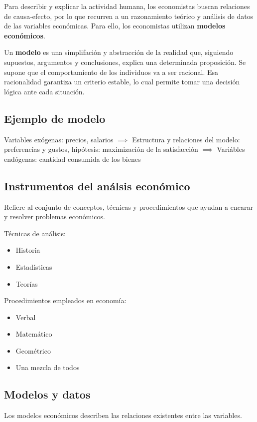 Para describir y explicar la actividad humana,
los economistas buscan relaciones de causa-efecto,
por lo que recurren a un razonamiento teórico
y análisis de datos de las variables económicas.
Para ello, los economistas utilizan \textbf{modelos económicos}.

Un \textbf{modelo} es una simplifación y abstracción de la realidad que,
siguiendo supuestos, argumentos y conclusiones,
explica una determinada proposición.
Se supone que el comportamiento de los individuos va a ser racional.
Esa racionalidad garantiza un criterio estable,
lo cual permite tomar una decisión lógica ante cada situación.

\subsection{Ejemplo de modelo}

Variables exógenas: precios, salarios \(\implies\) Estructura y relaciones del modelo: preferencias y gustos, hipótesis: maximización de la satisfacción \(\implies\) Variábles endógenas: cantidad consumida de los bienes

\subsection{Instrumentos del análsis económico}

Refiere al conjunto de conceptos,
técnicas y procedimientos que ayudan a encarar y resolver problemas económicos.

Técnicas de análisis:
\begin{itemize}
    \item Historia
    \item Estadísticas
    \item Teorías
\end{itemize}

Procedimientos empleados en economía:
\begin{itemize}
    \item Verbal
    \item Matemático
    \item Geométrico
    \item Una mezcla de todos
\end{itemize}

\subsection{Modelos y datos}

Los modelos económicos describen las relaciones existentes entre las variables.

